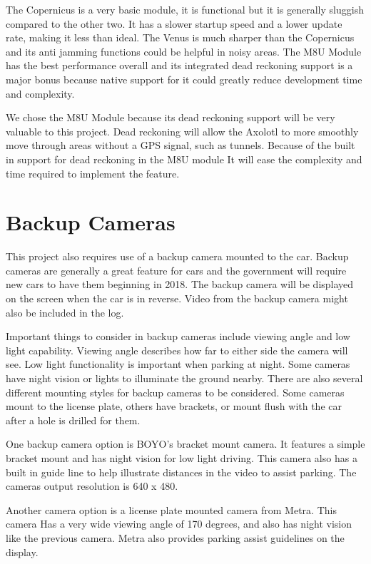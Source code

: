 \documentclass[onecolumn, draftclsnofoot,10pt, compsoc]{IEEEtran}
\begin{document}
The Copernicus is a very basic module, it is functional but it is generally
sluggish compared to the other two. It has a slower startup speed and a lower
update rate, making it less than ideal. The Venus is much sharper than the
Copernicus and its anti jamming functions could be helpful in noisy areas.
The M8U Module has the best performance overall and its integrated dead reckoning
support is a major bonus because native support for it could greatly reduce
development time and complexity.

We chose the M8U Module because its dead reckoning support will be very valuable
to this project. Dead reckoning will allow the Axolotl to more smoothly move
through areas without a GPS signal, such as tunnels. Because of the built in
support for dead reckoning in the M8U module It will ease the complexity and
time required to implement the feature.

\section{Backup Cameras}
This project also requires use of a backup camera mounted to the car. Backup
cameras are generally a great feature for cars and the government will require
new cars to have them beginning in 2018. The backup camera will be displayed on
the screen when the car is in reverse. Video from the backup camera might also
be included in the log.

Important things to consider in backup cameras include viewing angle and low
light capability. Viewing angle describes how far to either side the camera will
see. Low light functionality is important when parking at night. Some cameras
have night vision or lights to illuminate the ground nearby. There are also
several different mounting styles for backup cameras to be considered. Some
cameras mount to the license plate, others have brackets, or mount flush with
the car after a hole is drilled for them.

One backup camera option is BOYO's bracket mount camera. It features a simple
bracket mount and has night vision for low light driving. This camera also has
a built in guide line to help illustrate distances in the video to assist
parking. The cameras output resolution is 640 x 480.

Another camera option is a license plate mounted camera from Metra. This
camera Has a very wide viewing angle of 170 degrees, and also has night vision
like the previous camera. Metra also provides parking assist guidelines on the
display.
\end{document}
